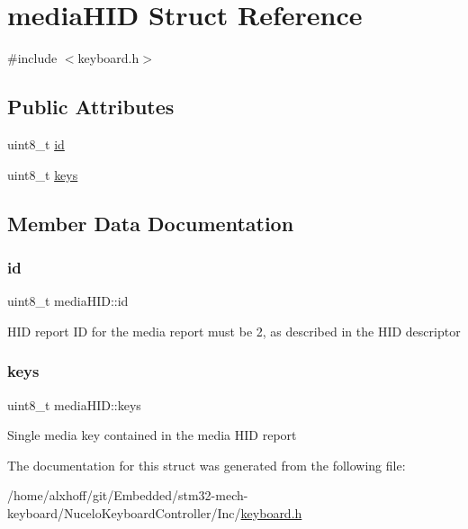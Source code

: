 \hypertarget{structmediaHID}{}\section{media\+H\+ID Struct Reference}
\label{structmediaHID}


{\ttfamily \#include $<$keyboard.\+h$>$}

\subsection*{Public Attributes}
\begin{DoxyCompactItemize}
\item 
uint8\+\_\+t \hyperlink{structmediaHID_acb241cd249b9115e95be210dd3832da8}{id}
\item 
uint8\+\_\+t \hyperlink{structmediaHID_afdb0783d63ec1bc175ec304efd8866b3}{keys}
\end{DoxyCompactItemize}


\subsection{Member Data Documentation}
\mbox{\label{structmediaHID_acb241cd249b9115e95be210dd3832da8}} 
\subsubsection{\texorpdfstring{id}{id}}
{\footnotesize\ttfamily uint8\+\_\+t media\+H\+I\+D\+::id}

H\+ID report ID for the media report must be 2, as described in the H\+ID descriptor \mbox{\label{structmediaHID_afdb0783d63ec1bc175ec304efd8866b3}} 
\subsubsection{\texorpdfstring{keys}{keys}}
{\footnotesize\ttfamily uint8\+\_\+t media\+H\+I\+D\+::keys}

Single media key contained in the media H\+ID report 

The documentation for this struct was generated from the following file\+:\begin{DoxyCompactItemize}
\item 
/home/alxhoff/git/\+Embedded/stm32-\/mech-\/keyboard/\+Nucelo\+Keyboard\+Controller/\+Inc/\hyperlink{keyboard_8h}{keyboard.\+h}\end{DoxyCompactItemize}
